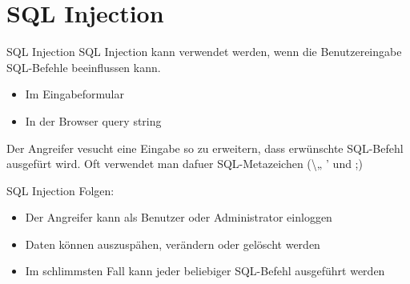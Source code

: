\documentclass[10pt]{beamer}
\begin{document}

\section{SQL Injection}

\begin{frame}[fragile]{SQL Injection}
  SQL Injection kann verwendet werden, wenn die Benutzereingabe SQL-Befehle beeinflussen kann.
  \begin{itemize}
    \item Im Eingabeformular
    \item In der Browser query string
  \end{itemize}
  Der Angreifer vesucht eine Eingabe so zu erweitern, dass erw\"unschte SQL-Befehl ausgef\"urt wird. Oft verwendet man dafuer SQL-Metazeichen (\textbackslash „ ' und ;)
  
\end{frame}
\begin{frame}[fragile]{SQL Injection}
  Folgen:
  \begin{itemize}
    \item Der Angreifer kann als Benutzer oder Administrator einloggen
    \item Daten k\"onnen auszusp\"ahen, ver\"andern oder gel\"oscht werden
    \item Im schlimmsten Fall kann jeder beliebiger SQL-Befehl ausgef\"uhrt werden
  \end{itemize}
\end{frame}

\end{document}
